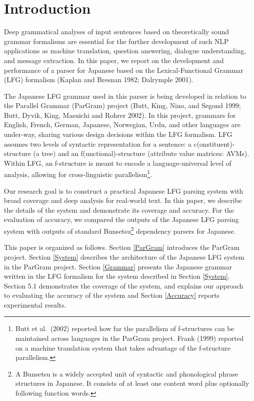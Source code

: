 \documentclass[english]{jnlp_1.4_rep}
\begin{document}
\maketitle

\section{Introduction}\label{Intro}

Deep grammatical analyses of input sentences based on theoretically
sound grammar formalisms are essential for the further development of
such NLP applications as machine translation, question answering,
dialogue understanding, and message extraction.  In this paper, we
report on the development and performance of a parser for Japanese
based on the Lexical-Functional Grammar (LFG) formalism (Kaplan and
Bresnan 1982; Dalrymple 2001).

The Japanese LFG grammar used in this parser is being developed in
relation to the Parallel Grammar (ParGram) project (Butt, King, Nino, and Segond 1999; 
Butt, Dyvik, King, Masuichi and Rohrer 2002).  In this project, grammars for English, French, German,
Japanese, Norwegian, Urdu, and other languages are under-way, sharing
various design decisions within the LFG formalism.  LFG assumes two
levels of syntactic representation for a sentence: a
c(onstituent)-structure (a tree) and an f(unctional)-structure
(attribute value matrices: AVMs).  Within LFG, an f-structure is meant
to encode a language-universal level of analysis, allowing for
cross-linguistic parallelism\footnote{Butt et al.\ (2002) reported how
  far the parallelism of f-structures can be maintained across
  languages in the ParGram project. Frank (1999) reported on a machine
  translation system that takes advantage of the f-structure
  parallelism.}.

Our research goal is to construct a practical Japanese LFG parsing
system with broad coverage and deep analysis for real-world text.  In
this paper, we describe the details of the system and demonstrate its
coverage and accuracy.  For the evaluation of accuracy, we compared
the outputs of the Japanese LFG parsing system with outputs of standard
Bunsetsu\footnote{A Bunsetsu is a widely accepted unit of syntactic and phonological phrase structures in Japanese. It consists of at least one content word plus optionally following function words.} dependency parsers for Japanese.

This paper is organized as follows.  Section \ref{ParGram} introduces
the ParGram project. Section \ref{System} describes the architecture
of the Japanese LFG system in the ParGram project.  Section
\ref{Grammar} presents the Japanese grammar written in the LFG
formalism for the system described in Section \ref{System}.  Section
5.1 demonstrates the coverage of the system, and explains
our approach to evaluating the accuracy of the system and Section
\ref{Accuracy} reports experimental results.
\end{document}
